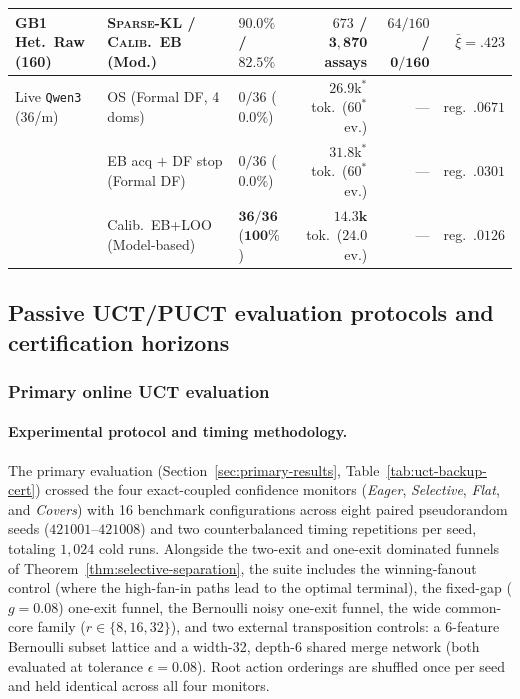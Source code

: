 \documentclass{article}
\theoremstyle{plain}
\theoremstyle{definition}
\begin{document}
\begin{table}[t]
{\begin{tabular}{@{}lllrrr@{}}
GB1 Het.\ Raw (160) & \textsc{Sparse-KL} / \textsc{Calib.\ EB} (Mod.) & $90.0\%$ / $82.5\%$ & $673$ / $\mathbf{3{,}870}$ assays & $64/160$ / $\mathbf{0/160}$ & $\bar\xi=.423$ \\
\midrule
Live \texttt{Qwen3} (36/m) & OS (Formal DF, 4 doms) & $0/36$ ($0.0\%$) & $26.9$k$^*$ tok.\ ($60^*$ ev.) & --- & reg.\ $.0671$ \\
 & EB acq $+$ DF stop (Formal DF) & $0/36$ ($0.0\%$) & $31.8$k$^*$ tok.\ ($60^*$ ev.) & --- & reg.\ $.0301$ \\
 & Calib.\ EB+LOO (Model-based) & $\mathbf{36/36}$ ($\mathbf{100\%}$) & $\mathbf{14.3\text{k}}$ tok.\ ($\mathbf{24.0}$ ev.) & --- & reg.\ $\mathbf{.0126}$ \\
\bottomrule
\end{tabular}%
}
\end{table}

\subsection{Passive UCT/PUCT evaluation protocols and certification horizons}
\label{sec:backup-experiments}\label{sec:primary-results}

\subsubsection{Primary online UCT evaluation}
\label{app:ta-data}

\paragraph{Experimental protocol and timing methodology.}

The primary evaluation (Section~\ref{sec:primary-results}, Table~\ref{tab:uct-backup-cert}) crossed the four exact-coupled confidence monitors (\emph{Eager}, \emph{Selective}, \emph{Flat}, and \emph{Covers}) with 16 benchmark configurations across eight paired pseudorandom seeds ($421001$--$421008$) and two counterbalanced timing repetitions per seed, totaling $1{,}024$ cold runs. Alongside the two-exit and one-exit dominated funnels of Theorem~\ref{thm:selective-separation}, the suite includes the winning-fanout control (where the high-fan-in paths lead to the optimal terminal), the fixed-gap ($g = 0.08$) one-exit funnel, the Bernoulli noisy one-exit funnel, the wide common-core family ($r \in \{8, 16, 32\}$), and two external transposition controls: a 6-feature Bernoulli subset lattice and a width-32, depth-6 shared merge network (both evaluated at tolerance $\epsilon = 0.08$). Root action orderings are shuffled once per seed and held identical across all four monitors.
\end{document}
